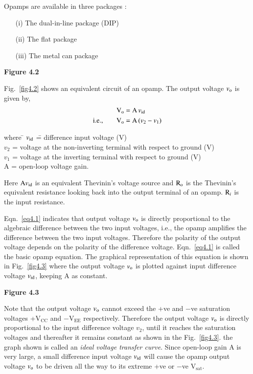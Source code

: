 Opamps are available in three packages :
\begin{itemize}
\item[(i)] The dual-in-line package (DIP)

\item[(ii)] The flat package

\item[(iii)] The metal can package
\end{itemize}


\begin{center}
{\bf Figure 4.2}
\end{center}

Fig.~\ref{fig4.2} shows an equivalent circuit of an opamp. The output voltage $v_{\textrm{o}}$ is given by,
\begin{align}
\textrm{V}_{\textrm{o}} &= \textrm{A} \, v_{\operatorname{id}}\notag\\
\text{i.e.,}\qquad \textrm{V}_{\textrm{o}} &= \textrm{A}\, (v_{2}-v_{1})\label{eq4.1}
\end{align}
\begin{tabbing}
where \= $v_{\operatorname{id}}$ \== difference input voltage (V)\\[3pt]
      \> $v_{2}$  \>= voltage at the non-inverting terminal with respect to ground (V)\\[3pt]
      \> $v_{1}$  \>= voltage at the inverting terminal with respect to ground (V)\\[3pt]
      \> A       \>= open-loop voltage gain.
\end{tabbing}

Here $\textrm{A} v_{\operatorname{id}}$ is an equivalent Thevinin's voltage source and $\textrm{R}_{\textrm{o}}$ is the Thevinin's equivalent resistance looking back into the output terminal of an opamp. $\textrm{R}_{i}$ is the input resistance.

Eqn.~\eqref{eq4.1} indicates that output voltage $v_{\textrm{o}}$ is directly proportional to the algebraic difference between the two input voltages, i.e., the opamp amplifies the difference between the two input voltages. Therefore the polarity of the output voltage depends on the polarity of the difference voltage. Eqn.~\eqref{eq4.1} is called the basic opamp equation. The graphical representation of this equation is shown in Fig.~\ref{fig4.3} where the output voltage $v_{\textrm{o}}$ is plotted against input difference voltage $v_{\operatorname{id}}$, keeping A as constant.
\begin{center}
{\bf Figure 4.3}
\end{center}
Note that the output voltage $v_{\textrm{o}}$ cannot exceed the +ve and $-$ve saturation voltages +V$_{\text{CC}}$ and $-$V$_{\text{EE}}$ respectively. Therefore the output voltage $v_{\textrm{o}}$ is directly proportional to the input difference voltage $v_{2}$, until it reaches the saturation voltages and thereafter it remains constant as shown in the Fig.~\ref{fig4.3}. the graph shown is called an {\em ideal voltage transfer curve}. Since open-loop gain A is very large, a small difference input voltage $v_{\operatorname{id}}$ will cause the opamp output voltage $v_{\textrm{o}}$ to be driven all the way to its extreme +ve or $-$ve V$_{\text{sat}}$.

